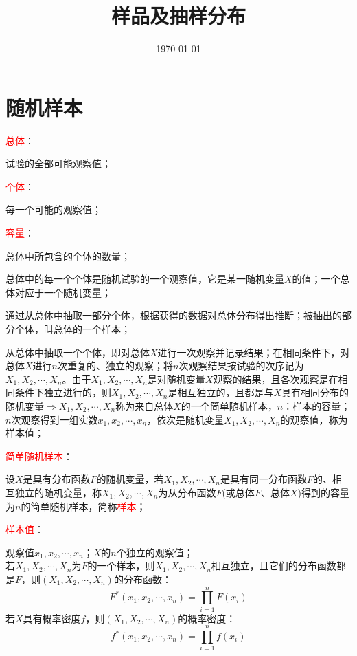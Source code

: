 \documentclass[12pt,a4paper]{article}
\title{样品及抽样分布}
\author{}
\date{\today}
\begin{document}
\maketitle
\section{随机样本}
\textcolor{red}{总体}：

试验的全部可能观察值；

\textcolor{red}{个体}：

每一个可能的观察值；

\textcolor{red}{容量}：

总体中所包含的个体的数量；

总体中的每一个个体是随机试验的一个观察值，它是某一随机变量$X$的值；一个总体对应于一个随机变量；

通过从总体中抽取一部分个体，根据获得的数据对总体分布得出推断；被抽出的部分个体，叫总体的一个样本；

从总体中抽取一个个体，即对总体$X$进行一次观察并记录结果；在相同条件下，对总体$X$进行$n$次重复的、独立的观察；将$n$次观察结果按试验的次序记为$X_1, X_2, \cdots, X_n$。由于$X_1, X_2, \cdots, X_n$是对随机变量$X$观察的结果，且各次观察是在相同条件下独立进行的，则$X_1, X_2, \cdots, X_n$是相互独立的，且都是与$X$具有相同分布的随机变量$\Longrightarrow$$X_1, X_2, \cdots, X_n$称为来自总体$X$的一个简单随机样本，$n$：样本的容量；$n$次观察得到一组实数$x_1, x_2, \cdots, x_n$，依次是随机变量$X_1, X_2, \cdots, X_n$的观察值，称为样本值；

\textcolor{red}{简单随机样本}：

设$X$是具有分布函数$F$的随机变量，若$X_1, X_2, \cdots, X_n$是具有同一分布函数$F$的、相互独立的随机变量，称$X_1, X_2, \cdots, X_n$为从分布函数$F$(或总体$F$、总体$X$)得到的容量为$n$的简单随机样本，简称\textcolor{red}{样本}；

\textcolor{red}{样本值}：

观察值$x_1, x_2, \cdots, x_n$；$X$的$n$个独立的观察值；\\

若$X_1, X_2, \cdots, X_n$为$F$的一个样本，则$X_1, X_2, \cdots, X_n$相互独立，且它们的分布函数都是$F$，则$(X_1, X_2, \cdots, X_n)$的分布函数：
\begin{equation}
F^*(x_1, x_2, \cdots, x_n) = \prod_{i=1}^{n} F(x_i)
\end{equation}
若$X$具有概率密度$f$，则$(X_1, X_2, \cdots, X_n)$的概率密度：
\begin{equation}
f^*(x_1, x_2, \cdots, x_n) = \prod_{i=1}^{n} f(x_i)
\end{equation}
\end{document}
